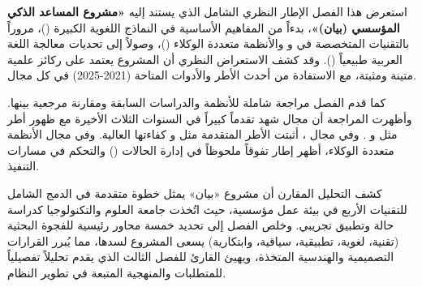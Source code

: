 استعرض هذا الفصل الإطار النظري الشامل الذي يستند إليه \textbf{«مشروع المساعد
الذكي المؤسسي (بيان)»}، بدءاً من المفاهيم الأساسية في النماذج اللغوية الكبيرة
()، مروراً بالتقنيات المتخصصة في  و  والأنظمة
متعددة الوكلاء ()، وصولاً إلى تحديات معالجة اللغة
العربية طبيعياً (). وقد كشف الاستعراض النظري أن المشروع يعتمد
على ركائز علمية متينة ومثبتة، مع الاستفادة من أحدث الأطر والأدوات المتاحة
(2021-2025) في كل مجال.

كما قدم الفصل مراجعة شاملة للأنظمة والدراسات السابقة ومقارنة مرجعية بينها.
وأظهرت المراجعة أن مجال  شهد تقدماً كبيراً في السنوات الثلاث
الأخيرة مع ظهور أطر مثل  و . وفي مجال
، أثبتت الأطر المتقدمة مثل  و  كفاءتها
العالية. وفي مجال الأنظمة متعددة الوكلاء، أظهر إطار \textbf{}
تفوقاً ملحوظاً في إدارة الحالات () والتحكم في مسارات
التنفيذ.

كشف التحليل المقارن أن مشروع «بيان» يمثل خطوة متقدمة في الدمج الشامل للتقنيات
الأربع في بيئة عمل مؤسسية، حيث اتُخذت جامعة العلوم والتكنولوجيا كدراسة حالة
وتطبيق تجريبي. وخلص الفصل إلى تحديد خمسة محاور رئيسية للفجوة البحثية (تقنية،
لغوية، تطبيقية، سياقية، وابتكارية) يسعى المشروع لسدها، مما يُبرر القرارات
التصميمية والهندسية المتخذة، ويهيئ القارئ للفصل الثالث الذي يقدم تحليلاً
تفصيلياً للمتطلبات والمنهجية المتبعة في تطوير النظام.
